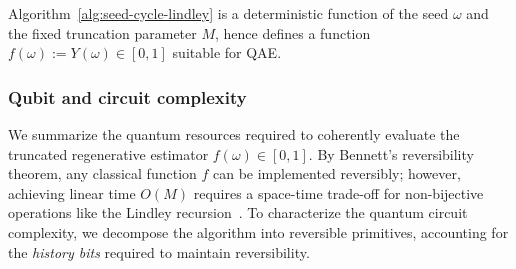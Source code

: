 \documentclass[11pt]{article}
\begin{document}
Algorithm~\ref{alg:seed-cycle-lindley} is a deterministic function of the seed
$\omega$ and the fixed truncation parameter $M$, hence defines a function
$f(\omega):=Y(\omega)\in[0,1]$ suitable for QAE.
\subsubsection{Qubit and circuit complexity}
\label{sec:resources-Gemini}

We summarize the quantum resources required to coherently evaluate the truncated
regenerative estimator $f(\omega)\in[0,1]$.
By Bennett’s reversibility theorem, any classical function $f$ can be implemented reversibly;
however, achieving linear time $O(M)$ requires a space-time trade-off for non-bijective operations like the Lindley recursion~\cite{bennett1973, bennett1989}.
To characterize the quantum circuit complexity, we decompose the algorithm into reversible primitives, accounting for the \textit{history bits} required to maintain reversibility.
\end{document}
